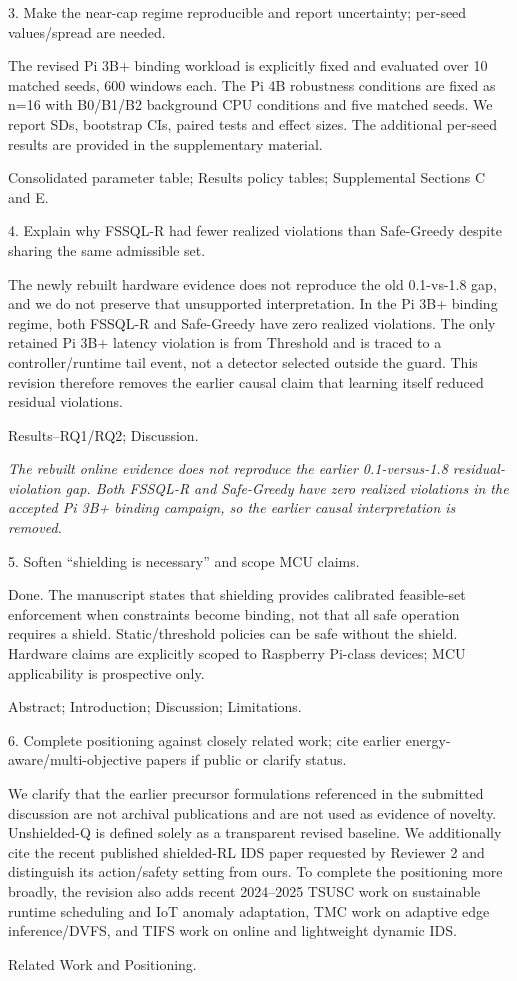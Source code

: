 \documentclass[11pt,a4paper]{article}
\newcommand{\commentbox}[1]{\begin{rcommentbox}#1\end{rcommentbox}}
\newcommand{\responsebox}[1]{\begin{authorresponsebox}#1\end{authorresponsebox}}
\newcommand{\changebox}[1]{\begin{wherebox}#1\end{wherebox}}
\begin{document}
\commentbox{3. Make the near-cap regime reproducible and report uncertainty; per-seed values/spread are needed.}
\responsebox{The revised Pi 3B+ binding workload is explicitly fixed and evaluated over 10 matched seeds, 600 windows each. The Pi 4B robustness conditions are fixed as n=16 with B0/B1/B2 background CPU conditions and five matched seeds. We report SDs, bootstrap CIs, paired tests and effect sizes. The additional per-seed results are provided in the supplementary material.}
\changebox{Consolidated parameter table; Results policy tables; Supplemental Sections C and E.}

\commentbox{4. Explain why FSSQL-R had fewer realized violations than Safe-Greedy despite sharing the same admissible set.}
\responsebox{The newly rebuilt hardware evidence does not reproduce the old 0.1-vs-1.8 gap, and we do not preserve that unsupported interpretation. In the Pi 3B+ binding regime, both FSSQL-R and Safe-Greedy have zero realized violations. The only retained Pi 3B+ latency violation is from Threshold and is traced to a controller/runtime tail event, not a detector selected outside the guard. This revision therefore removes the earlier causal claim that learning itself reduced residual violations.}
\changebox{Results--RQ1/RQ2; Discussion.}
\begin{excerptbox}
\emph{The rebuilt online evidence does not reproduce the earlier 0.1-versus-1.8 residual-violation gap. Both FSSQL-R and Safe-Greedy have zero realized violations in the accepted Pi 3B+ binding campaign, so the earlier causal interpretation is removed.}
\end{excerptbox}

\commentbox{5. Soften ``shielding is necessary'' and scope MCU claims.}
\responsebox{Done. The manuscript states that shielding provides calibrated feasible-set enforcement when constraints become binding, not that all safe operation requires a shield. Static/threshold policies can be safe without the shield. Hardware claims are explicitly scoped to Raspberry Pi-class devices; MCU applicability is prospective only.}
\changebox{Abstract; Introduction; Discussion; Limitations.}

\commentbox{6. Complete positioning against closely related work; cite earlier energy-aware/multi-objective papers if public or clarify status.}
\responsebox{We clarify that the earlier precursor formulations referenced in the submitted discussion are not archival publications and are not used as evidence of novelty. Unshielded-Q is defined solely as a transparent revised baseline. We additionally cite the recent published shielded-RL IDS paper requested by Reviewer 2 and distinguish its action/safety setting from ours. To complete the positioning more broadly, the revision also adds recent 2024--2025 TSUSC work on sustainable runtime scheduling and IoT anomaly adaptation, TMC work on adaptive edge inference/DVFS, and TIFS work on online and lightweight dynamic IDS.}
\changebox{Related Work and Positioning.}
\end{document}
